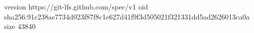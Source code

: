 version https://git-lfs.github.com/spec/v1
oid sha256:91c238ae7734d023f87f8c1e627d41f9f3d505021f321331dd5ad2626013ca0a
size 43840
